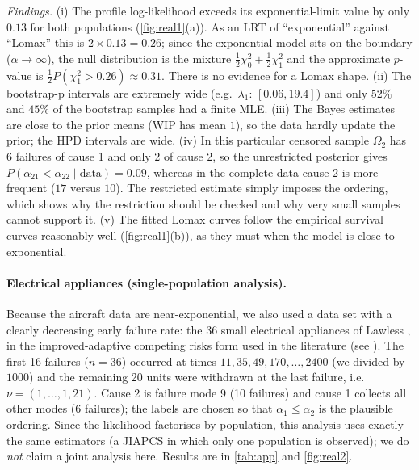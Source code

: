 \documentclass[a4paper,11pt]{article}
\begin{document}
\emph{Findings.} (i) The profile log-likelihood exceeds its exponential-limit value by only $0.13$ for both populations (\cref{fig:real1}(a)). As an LRT of ``exponential'' against ``Lomax'' this is $2\times0.13=0.26$; since the exponential model sits on the boundary ($\alpha\to\infty$), the null distribution is the mixture $\tfrac12\chi^2_0+\tfrac12\chi^2_1$ and the approximate $p$-value is $\tfrac12P(\chi^2_1>0.26)\approx0.31$. There is no evidence for a Lomax shape. (ii) The bootstrap-p intervals are extremely wide (e.g.\ $\lambda_1$: $[0.06,19.4]$) and only $52\%$ and $45\%$ of the bootstrap samples had a finite MLE. (iii) The Bayes estimates are close to the prior means (WIP has mean $1$), so the data hardly update the prior; the HPD intervals are wide. (iv) In this particular censored sample $\Omega_2$ has $6$ failures of cause 1 and only $2$ of cause 2, so the unrestricted posterior gives $P(\alpha_{21}<\alpha_{22}\mid\text{data})=0.09$, whereas in the complete data cause 2 is more frequent ($17$ versus $10$). The restricted estimate simply imposes the ordering, which shows why the restriction should be checked and why very small samples cannot support it. (v) The fitted Lomax curves follow the empirical survival curves reasonably well (\cref{fig:real1}(b)), as they must when the model is close to exponential.

\paragraph{Electrical appliances (single-population analysis).} Because the aircraft data are near-exponential, we also used a data set with a clearly decreasing early failure rate: the 36 small electrical appliances of Lawless \cite{lawless2003}, in the improved-adaptive competing risks form used in the literature (see \cite{alotaibi2025}). The first 16 failures ($n=36$) occurred at times $11,35,49,170,\dots,2400$ (we divided by $1000$) and the remaining 20 units were withdrawn at the last failure, i.e.\ $\nu=(1,\dots,1,21)$. Cause 2 is failure mode 9 (10 failures) and cause 1 collects all other modes (6 failures); the labels are chosen so that $\alpha_1\le\alpha_2$ is the plausible ordering. Since the likelihood factorises by population, this analysis uses exactly the same estimators (a JIAPCS in which only one population is observed); we do \emph{not} claim a joint analysis here. Results are in \cref{tab:app} and \cref{fig:real2}.
\end{document}
